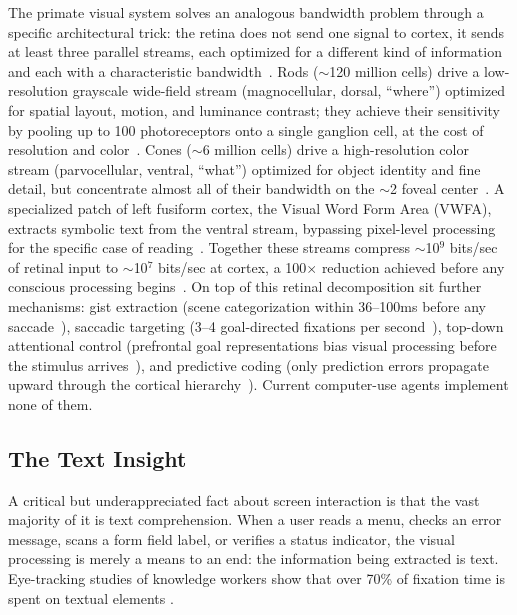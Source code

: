 \documentclass[11pt,a4paper]{article}
\begin{document}
The primate visual system solves an analogous bandwidth problem through a specific architectural trick: the retina does not send one signal to cortex, it sends at least three parallel streams, each optimized for a different kind of information and each with a characteristic bandwidth~\cite{livingstone-hubel-segregation,koch2006retina}.
Rods ($\sim$120 million cells) drive a low-resolution grayscale wide-field stream (magnocellular, dorsal, ``where'') optimized for spatial layout, motion, and luminance contrast; they achieve their sensitivity by pooling up to 100 photoreceptors onto a single ganglion cell, at the cost of resolution and color~\cite{curcio-photoreceptor}.
Cones ($\sim$6 million cells) drive a high-resolution color stream (parvocellular, ventral, ``what'') optimized for object identity and fine detail, but concentrate almost all of their bandwidth on the $\sim$2\textdegree{} foveal center~\cite{wandell2007visual,goodale1992separate}.
A specialized patch of left fusiform cortex, the Visual Word Form Area (VWFA), extracts symbolic text from the ventral stream, bypassing pixel-level processing for the specific case of reading~\cite{dehaene-cohen-vwfa}.
Together these streams compress $\sim$10$^9$ bits/sec of retinal input to $\sim$10$^7$ bits/sec at cortex, a 100$\times$ reduction achieved before any conscious processing begins~\cite{koch2006retina}.
On top of this retinal decomposition sit further mechanisms: gist extraction (scene categorization within 36--100ms before any saccade~\cite{oliva-torralba-gist,thorpe1996speed}), saccadic targeting (3--4 goal-directed fixations per second~\cite{land-hayhoe-saccades}), top-down attentional control (prefrontal goal representations bias visual processing before the stimulus arrives~\cite{desimone-duncan-attention,wolfe-guided-search}), and predictive coding (only prediction errors propagate upward through the cortical hierarchy~\cite{rao-ballard-1999}). Current computer-use agents implement none of them.

\subsection{The Text Insight}
\label{sec:intro-text-insight}

A critical but underappreciated fact about screen interaction is that the vast majority of it is text comprehension.
When a user reads a menu, checks an error message, scans a form field label, or verifies a status indicator, the visual processing is merely a means to an end: the information being extracted is text.
Eye-tracking studies of knowledge workers show that over 70\% of fixation time is spent on textual elements \cite{rayner-eye-movements}.
\end{document}
